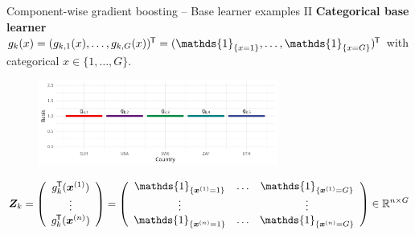 \documentclass[10pt]{beamer}
\begin{document}


\begin{frame}{Component-wise gradient boosting -- Base learner examples II}
  \textbf{Categorical base learner} $g_k(x) = (g_{k,1}(x), \dots, g_{k,G}(x))^\tran = (\mathds{1}_{\{x = 1\}}, \dots, \mathds{1}_{\{x = G\}})^\tran$ with categorical $x\in\{1, \dots, G\}$.

  \begin{center}
    \begin{figure}
      \includegraphics[width=0.7\textwidth]{figures/bs-cat/fig-cat0.png}
    \end{figure}
    \vspace{-0.5cm}
    $$
    \design_k = \left(\begin{array}{c}
      g_{k}^\tran(\xi[1]) \\
      \vdots \\
      g_{k}^\tran(\xi[n])
    \end{array}\right) = \left(\begin{array}{ccc}
      \mathds{1}_{\{\xi[1] = 1\}} & \dots & \mathds{1}_{\{\xi[1] = G\}} \\
      \vdots &  & \vdots \\
      \mathds{1}_{\{\xi[n] = 1\}} & \dots & \mathds{1}_{\{\xi[n] = G\}} \\
    \end{array}\right)\in\R^{n\times G}
    $$
  \end{center}

\end{frame}
\end{document}
